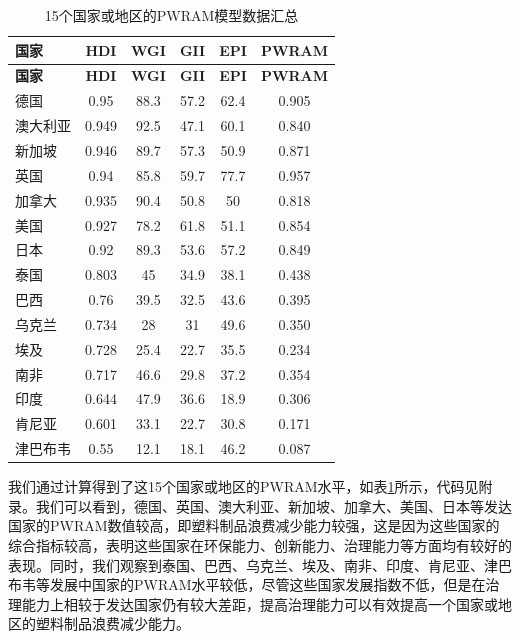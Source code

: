 \documentclass[UTF8, fontset=windows]{mcmthesis}
\begin{document}
\begin{longtable}{|l|c|c|c|c|c|}
  \caption{15个国家或地区的PWRAM模型数据汇总}\label{tab:pwram}\\
  \hline
  \textbf{国家} & \textbf{HDI} & \textbf{WGI} & \textbf{GII} & \textbf{EPI} & \textbf{PWRAM} \\
  \hline
  \endfirsthead
  \hline
  \textbf{国家} & \textbf{HDI} & \textbf{WGI} & \textbf{GII} & \textbf{EPI} & \textbf{PWRAM} \\
  \hline
  \endhead
  \hline
  \endfoot
  
  德国 & 0.95 & 88.3 & 57.2 & 62.4 & 0.905 \\
  澳大利亚 & 0.949 & 92.5 & 47.1 & 60.1 & 0.840 \\
  新加坡 & 0.946 & 89.7 & 57.3 & 50.9 & 0.871 \\
  英国 & 0.94 & 85.8 & 59.7 & 77.7 & 0.957 \\
  加拿大 & 0.935 & 90.4 & 50.8 & 50 & 0.818 \\
  美国 & 0.927 & 78.2 & 61.8 & 51.1 & 0.854 \\
  日本 & 0.92 & 89.3 & 53.6 & 57.2 & 0.849 \\
  泰国 & 0.803 & 45 & 34.9 & 38.1 & 0.438 \\
  巴西 & 0.76 & 39.5 & 32.5 & 43.6 & 0.395 \\
  乌克兰 & 0.734 & 28 & 31 & 49.6 & 0.350 \\
  埃及 & 0.728 & 25.4 & 22.7 & 35.5 & 0.234 \\
  南非 & 0.717 & 46.6 & 29.8 & 37.2 & 0.354 \\
  印度 & 0.644 & 47.9 & 36.6 & 18.9 & 0.306 \\
  肯尼亚 & 0.601 & 33.1 & 22.7 & 30.8 & 0.171 \\
  津巴布韦 & 0.55 & 12.1 & 18.1 & 46.2 & 0.087 \\
\end{longtable}

我们通过计算得到了这15个国家或地区的PWRAM水平，如表\ref{tab:pwram}所示，代码见附录。我们可以看到，德国、英国、澳大利亚、新加坡、加拿大、美国、日本等发达国家的PWRAM数值较高，即塑料制品浪费减少能力较强，这是因为这些国家的综合指标较高，表明这些国家在环保能力、创新能力、治理能力等方面均有较好的表现。同时，我们观察到泰国、巴西、乌克兰、埃及、南非、印度、肯尼亚、津巴布韦等发展中国家的PWRAM水平较低，尽管这些国家发展指数不低，但是在治理能力上相较于发达国家仍有较大差距，提高治理能力可以有效提高一个国家或地区的塑料制品浪费减少能力。
\end{document}

